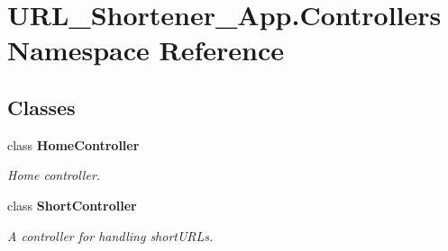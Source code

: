 \hypertarget{namespace_u_r_l___shortener___app_1_1_controllers}{}\section{U\+R\+L\+\_\+\+Shortener\+\_\+\+App.\+Controllers Namespace Reference}
\label{namespace_u_r_l___shortener___app_1_1_controllers}
\subsection*{Classes}
\begin{DoxyCompactItemize}
\item 
class {\bfseries Home\+Controller}
\begin{DoxyCompactList}\small\item\em Home controller. \end{DoxyCompactList}\item 
class {\bfseries Short\+Controller}
\begin{DoxyCompactList}\small\item\em A controller for handling short\+U\+R\+Ls. \end{DoxyCompactList}\end{DoxyCompactItemize}
